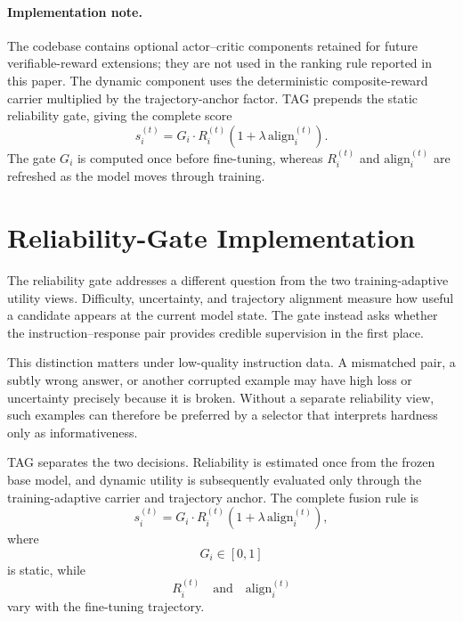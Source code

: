 \paragraph{Implementation note.}
The codebase contains optional actor--critic components retained for
future verifiable-reward extensions; they are not used in the ranking
rule reported in this paper. The dynamic component uses the
deterministic composite-reward carrier multiplied by the
trajectory-anchor factor. TAG prepends the static reliability gate,
giving the complete score
\[
s_i^{(t)}
=
G_i
\cdot
R_i^{(t)}
\left(
1+\lambda\,\mathrm{align}_i^{(t)}
\right).
\]
The gate \(G_i\) is computed once before fine-tuning, whereas
\(R_i^{(t)}\) and \(\mathrm{align}_i^{(t)}\) are refreshed as the
model moves through training.



\section{Reliability-Gate Implementation}
\label{app:reliability-gate}

The reliability gate addresses a different question from the two
training-adaptive utility views. Difficulty, uncertainty, and
trajectory alignment measure how useful a candidate appears at the
current model state. The gate instead asks whether the
instruction--response pair provides credible supervision in the first
place.

This distinction matters under low-quality instruction data. A
mismatched pair, a subtly wrong answer, or another corrupted example
may have high loss or uncertainty precisely because it is broken.
Without a separate reliability view, such examples can therefore be
preferred by a selector that interprets hardness only as
informativeness.

TAG separates the two decisions. Reliability is estimated once from
the frozen base model, and dynamic utility is subsequently evaluated
only through the training-adaptive carrier and trajectory anchor. The
complete fusion rule is
\begin{equation}
s_i^{(t)}
=
G_i
\cdot
R_i^{(t)}
\left(
1+\lambda\,\mathrm{align}_i^{(t)}
\right),
\label{eq:tag-score-app}
\end{equation}
where
\[
G_i\in[0,1]
\]
is static, while
\[
R_i^{(t)}
\quad\text{and}\quad
\mathrm{align}_i^{(t)}
\]
vary with the fine-tuning trajectory.


